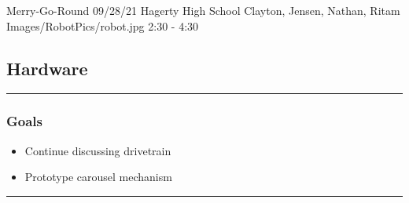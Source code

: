 \insertmeeting 
	{Merry-Go-Round} 
	{09/28/21}
	{Hagerty High School}
	{Clayton, Jensen, Nathan, Ritam}
	{Images/RobotPics/robot.jpg}
	{2:30 - 4:30}
	
\subsection*{Hardware}
\noindent\hfil\rule{\textwidth}{.4pt}\hfil
\subsubsection*{Goals}
\begin{itemize}
    \item Continue discussing drivetrain
    \item Prototype carousel mechanism
  

\end{itemize} 

\noindent\hfil\rule{\textwidth}{.4pt}\hfil

